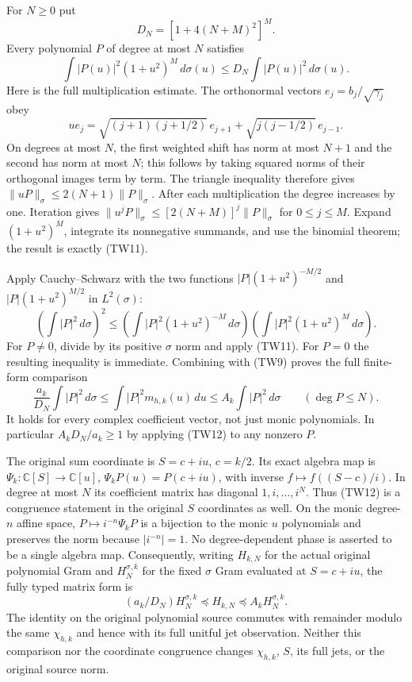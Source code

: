 \documentclass[11pt,a4paper]{article}
\begin{document}
For $N\geq0$ put
\[
 D_N=[1+4(N+M)^2]^M.
\]
Every polynomial $P$ of degree at most $N$ satisfies
\[
 \int |P(u)|^2(1+u^2)^M\,d\sigma(u)
 \leq D_N\int |P(u)|^2\,d\sigma(u).
 \tag{TW11}
\]
Here is the full multiplication estimate.  The orthonormal vectors
$e_j=b_j/\sqrt{\gamma_j}$ obey
\[
 u e_j=\sqrt{(j+1)(j+1/2)}\,e_{j+1}
       +\sqrt{j(j-1/2)}\,e_{j-1}.
\]
On degrees at most $N$, the first weighted shift has norm at most
$N+1$ and the second has norm at most $N$; this follows by taking
squared norms of their orthogonal images term by term.
The triangle inequality therefore gives
$\|uP\|_\sigma\leq2(N+1)\|P\|_\sigma$.
After each multiplication the degree increases by one.  Iteration gives
$\|u^jP\|_\sigma\leq[2(N+M)]^j\|P\|_\sigma$ for $0\leq j\leq M$.
Expand $(1+u^2)^M$, integrate its nonnegative summands, and use the
binomial theorem; the result is exactly (TW11).

Apply Cauchy--Schwarz with the two functions
$|P|(1+u^2)^{-M/2}$ and $|P|(1+u^2)^{M/2}$ in $L^2(\sigma)$:
\[
 \left(\int|P|^2\,d\sigma\right)^2
 \leq\left(\int|P|^2(1+u^2)^{-M}\,d\sigma\right)
       \left(\int|P|^2(1+u^2)^M\,d\sigma\right).
\]
For $P\ne0$, divide by its positive $\sigma$ norm and apply (TW11).
For $P=0$ the resulting inequality is immediate.
Combining with (TW9) proves the full finite-form comparison
\[
 \boxed{
 \frac{a_k}{D_N}\int|P|^2\,d\sigma
 \leq\int|P|^2m_{h,k}(u)\,du
 \leq A_k\int|P|^2\,d\sigma
 \qquad(\deg P\leq N).}
 \tag{TW12}
\]
It holds for every complex coefficient vector, not just monic polynomials.
In particular $A_kD_N/a_k\geq1$ by applying (TW12) to any nonzero $P$.

The original sum coordinate is $S=c+iu$, $c=k/2$.  Its exact algebra
map is $\Psi_k:\mathbb C[S]\to\mathbb C[u]$,
$\Psi_k P(u)=P(c+iu)$, with inverse $f\mapsto f((S-c)/i)$.
In degree at most $N$ its coefficient matrix has diagonal
$1,i,\ldots,i^N$.  Thus (TW12) is a congruence statement in the
original $S$ coordinates as well.  On the monic degree-$n$ affine
space, $P\mapsto i^{-n}\Psi_kP$ is a bijection to the monic $u$
polynomials and preserves the norm because $|i^{-n}|=1$.
No degree-dependent phase is asserted to be a single algebra map.
Consequently, writing $H_{k,N}$ for the actual original polynomial
Gram and $H_{N}^{\sigma,k}$ for the fixed $\sigma$ Gram evaluated at
$S=c+iu$, the fully typed matrix form is
\[
 \boxed{(a_k/D_N)H_N^{\sigma,k}\preceq H_{k,N}
 \preceq A_kH_N^{\sigma,k}.}\tag{TW13}
\]
The identity on the original polynomial source commutes with remainder
modulo the same $\chi_{h,k}$ and hence with its full unitful jet
observation.  Neither this comparison nor the coordinate congruence
changes $\chi_{h,k}$, $S$, its full jets, or the original source norm.
\end{document}

